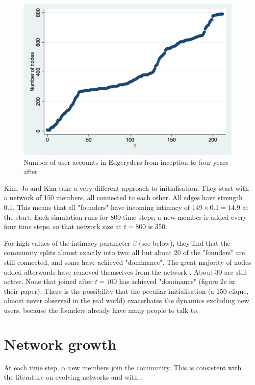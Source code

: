 \documentclass{article}
\begin{document}
\begin{figure}
	\includegraphics[width = \textwidth]{Growth_ER} 
	\caption{Number of user accounts in Edgeryders from inception to four years after}
	\label{fig:growthER}
\end{figure}

Kim, Jo and Kim take a very different approach to initialisation. They start with a network of 150 members, all connected to each other. All edges have strength 0.1. This means that all "founders" have incoming intimacy of $149 \times 0.1 = 14.9$ at the start. Each simulation runs for 800 time steps; a new member is added every four time steps, so that network size at $t = 800$ is 350. 

For high values of the intimacy parameter $\beta$ (see below), they find that the community splits almost exactly into two: all but about 20 of the "founders" are still connected, and some have achieved "dominance". The great majority of nodes added afterwards have removed themselves from the network . About 30 are still active. None that joined after $t = 100$ has achieved "dominance" (figure 2c in their paper). There is the possibility that the peculiar initialisation (a 150-clique, almost never observed in the real world) exacerbates the dynamics excluding new users, because the founders already have many people to talk to. 

\section{Network growth}

At each time step, $\alpha$ new members join the community. This is consistent with the literature on evolving networks and with \cite{kim2015group}.
\end{document}
